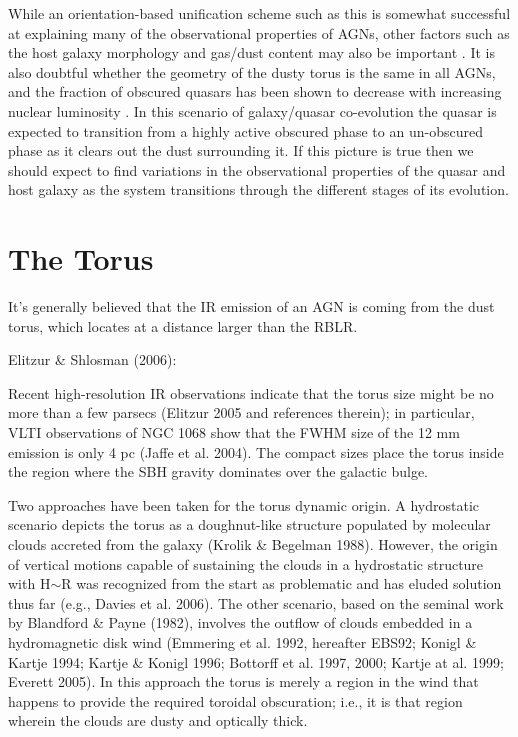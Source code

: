 While an orientation-based unification scheme such as this is somewhat successful at explaining many of the observational properties of AGNs, other factors such as the host galaxy morphology and gas/dust content may also be important \citep{peterson95}. 
It is also doubtful whether the geometry of the dusty torus is the same in all AGNs, and the fraction of obscured quasars has been shown to decrease with increasing nuclear luminosity \citep{lawrence91}. 
In this scenario of galaxy/quasar co-evolution the quasar is expected to transition from a highly active obscured phase to an un-obscured phase as it clears out the dust surrounding it. 
If this picture is true then we should expect to find variations in the observational properties of the quasar and host galaxy as the system transitions through the different stages of its evolution.  

\section{The Torus}

It’s generally believed that the IR emission of an AGN is coming from the dust torus, which
locates at a distance larger than the RBLR.

Elitzur \& Shlosman (2006): 

Recent high-resolution IR observations indicate that the torus size might be no more than a few parsecs (Elitzur 2005 and references therein); in particular, VLTI observations of NGC 1068 show that the FWHM size of the 12 mm emission is only 4 pc (Jaffe et al. 2004). 
The compact sizes place the torus inside the region where the SBH gravity dominates over the galactic bulge.

Two approaches have been taken for the torus dynamic origin. 
A hydrostatic scenario depicts the torus as a doughnut-like structure populated by molecular clouds accreted from the galaxy (Krolik \& Begelman 1988). 
However, the origin of vertical motions capable of sustaining the clouds in a hydrostatic structure with H$\sim$R was recognized from the start as problematic and has eluded solution thus far (e.g., Davies et al. 2006). 
The other scenario, based on the seminal work by Blandford \& Payne (1982), involves the outflow of clouds embedded in a hydromagnetic disk wind (Emmering et al. 1992, hereafter EBS92; Konigl \& Kartje 1994; Kartje \& Konigl 1996; Bottorff et al. 1997, 2000; Kartje at al. 1999; Everett 2005). 
In this approach the torus is merely a region in the wind that happens to provide the required toroidal obscuration; i.e., it is that region wherein the clouds are dusty and optically thick.

